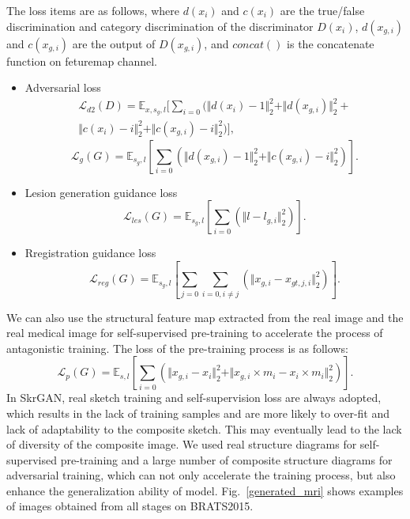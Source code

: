 \documentclass[runningheads]{llncs}
\begin{document}
	The loss items are as follows, where $d(x_{i})$ and $c(x_{i})$ are the true/false discrimination and category discrimination of the discriminator $D(x_i)$, $d(x_{g, i})$ and $c(x_{g,i})$ are the output of $D(x_{g,i})$, and $concat()$ is the concatenate function on feturemap channel. 
	\begin{itemize}
		\item{Adversarial loss}
		\begin{equation}
		\begin{split}
		\mathcal{L}_{d2}(D)=\mathbb{E}_{x,s_g,l}[\sum\limits_{i=0}(\Vert{d(x_i)-1}\Vert_{2}^{2}+\Vert{d(x_{g,i})}\Vert_{2}^{2}+\\
		\Vert{c(x_i)-i}\Vert_{2}^{2}+\Vert{c(x_{g,i})-i}\Vert_{2}^{2})],
		\end{split}
		\end{equation}
		\begin{equation}
		\mathcal{L}_{g}(G)=\mathbb{E}_{s_g,l}[\sum\limits_{i=0}(\Vert{d(x_{g,i})-1}\Vert_{2}^{2}+\Vert{c(x_{g,i})-i}\Vert_{2}^{2})].
		\end{equation}
		\item{Lesion generation guidance loss}
		\begin{equation}
		\mathcal{L}_{les}(G)=\mathbb{E}_{s_g,l}[\sum\limits_{i=0}(\Vert{l-l_{g,i}}\Vert_{2}^{2})].
		\end{equation}
		\item{Rregistration guidance loss}
		\begin{equation}
		\mathcal{L}_{reg}(G)=\mathbb{E}_{s_g,l}[\sum\limits_{j=0}\sum\limits_{i=0,i\neq j}(\Vert{x_{g,i}-x_{gt,j,i}}\Vert_{2}^{2})].
		\end{equation}
	\end{itemize}
	We can also use the structural feature map extracted from the real image and the real medical image for self-supervised pre-training to accelerate the process of antagonistic training. The loss of the pre-training process is as follows:
	\begin{equation}
	\mathcal{L}_{p}(G)=\mathbb{E}_{s,l}[\sum\limits_{i=0}(\Vert{x_{g,i}-x_i}\Vert_{2}^{2}+\Vert{x_{g,i}\times m_i-x_{i}\times m_i}\Vert_{2}^{2})].
	\end{equation}
	In SkrGAN\cite{96zhang2019skrgan:}, real sketch training and self-supervision loss are always adopted, which results in the lack of training samples and are more likely to over-fit and lack of adaptability to the composite sketch. This may eventually lead to the lack of diversity of the composite image. We used real structure diagrams for self-supervised pre-training and a large number of composite structure diagrams for adversarial training, which can not only accelerate the training process, but also enhance the generalization ability of model. Fig.~\ref{generated_mri} shows examples of images obtained from all stages on BRATS2015.
\end{document}
